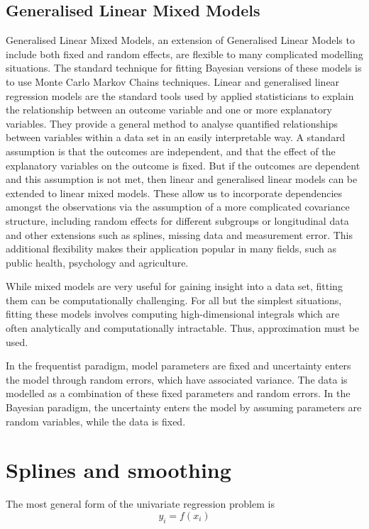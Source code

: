 \subsection{Generalised Linear Mixed Models}
Generalised Linear Mixed Models, an extension of Generalised Linear Models to include both fixed and random
effects, are flexible to many complicated modelling situations. The standard technique for fitting Bayesian
versions of these models is to use Monte Carlo Markov Chains techniques. Linear and generalised linear
regression models are the standard tools used by applied statisticians to explain the relationship between an
outcome variable and one or more explanatory variables. They provide a general method  to analyse quantified
relationships between variables within a data set in an easily interpretable way. A standard assumption is
that the outcomes are independent, and that the effect of the explanatory variables on the outcome is fixed.
But if the outcomes are dependent and this assumption is not met, then linear and generalised linear models
can be extended to linear mixed models. These allow us to incorporate dependencies amongst the  observations
via the assumption of a more complicated covariance structure, including random effects for  different
subgroups or longitudinal data and other extensions such as splines, missing data and measurement error. This
additional flexibility makes their application popular in many fields, such as public health, psychology and
agriculture.

While mixed models are very useful for gaining insight into a data set, fitting them can be computationally
challenging. For all but the simplest situations, fitting these models involves computing high-dimensional
integrals which are often analytically and computationally intractable. Thus, approximation must be used.

In the frequentist paradigm, model parameters are fixed and uncertainty enters the model through random
errors, which have associated variance. The data is modelled as a combination of these fixed parameters and
random errors. In the Bayesian paradigm, the uncertainty enters the model by assuming parameters are random
variables, while the data is fixed.

\section{Splines and smoothing}
The most general form of the univariate regression problem is
\[
	y_i = f(x_i)
\]

